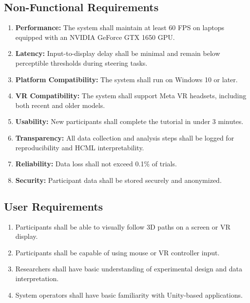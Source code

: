 \documentclass[sigconf]{acmart}
\begin{document}
\subsection{Non-Functional Requirements}
\begin{enumerate}[label=NFR\arabic*:]
  \item \textbf{Performance:} The system shall maintain at least 60 FPS
        on laptops equipped with an NVIDIA GeForce GTX 1650 GPU.
  \item \textbf{Latency:} Input-to-display delay shall be minimal and remain
        below perceptible thresholds during steering tasks.
  \item \textbf{Platform Compatibility:} The system shall run on Windows 10 or later.
  \item \textbf{VR Compatibility:} The system shall support Meta VR headsets,
        including both recent and older models.
  \item \textbf{Usability:} New participants shall complete the tutorial in under 3 minutes.
  \item \textbf{Transparency:} All data collection and analysis steps shall be logged
        for reproducibility and HCML interpretability.
  \item \textbf{Reliability:} Data loss shall not exceed 0.1\% of trials.
  \item \textbf{Security:} Participant data shall be stored securely and anonymized.
\end{enumerate}

\subsection{User Requirements}
\begin{enumerate}[label=UR\arabic*:]
  \item Participants shall be able to visually follow 3D paths on a screen or VR display.
  \item Participants shall be capable of using mouse or VR controller input.
  \item Researchers shall have basic understanding of experimental design
        and data interpretation.
  \item System operators shall have basic familiarity with Unity-based applications.
\end{enumerate}
\end{document}
